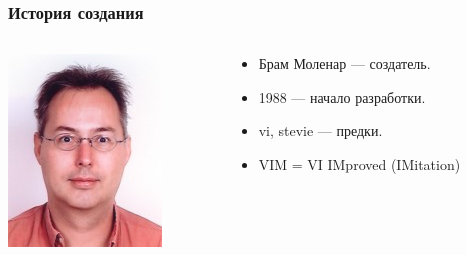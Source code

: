 \documentclass[aspectratio=169]{beamer}
\begin{document}
    \begin{frame}\frametitle{История создания}
        \begin{columns}[T,onlytextwidth]
            \begin{column}{0.5\textwidth}
                \includegraphics[height=0.8\textheight]{bram}
            \end{column}
            \begin{column}{0.5\textwidth}
                \begin{itemize}
                    \item Брам Моленар --- создатель.
                    \item 1988 --- начало разработки.
                    \item vi, stevie --- предки.
                    \item VIM = VI IMproved (IMitation)
                \end{itemize}
            \end{column}
        \end{columns}
    \end{frame}
\end{document}
